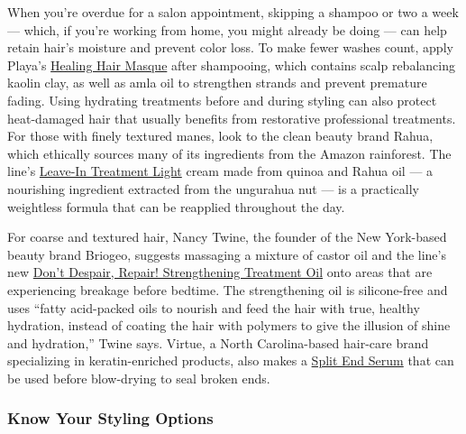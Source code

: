 When you're overdue for a salon appointment, skipping a shampoo or two a
week --- which, if you're working from home, you might already be doing
--- can help retain hair's moisture and prevent color loss. To make
fewer washes count, apply Playa's
\href{https://playabeauty.com/products/healing-hair-masque}{Healing Hair
Masque} after shampooing, which contains scalp rebalancing kaolin clay,
as well as amla oil to strengthen strands and prevent premature fading.
Using hydrating treatments before and during styling can also protect
heat-damaged hair that usually benefits from restorative professional
treatments. For those with finely textured manes, look to the clean
beauty brand Rahua, which ethically sources many of its ingredients from
the Amazon rainforest. The line's
\href{https://rahua.com/collections/styling/products/rahua-leave-in-treatment-light}{Leave-In
Treatment Light} cream made from quinoa and Rahua oil --- a nourishing
ingredient extracted from the ungurahua nut --- is a practically
weightless formula that can be reapplied throughout the day.

For coarse and textured hair, Nancy Twine, the founder of the New
York-based beauty brand Briogeo, suggests massaging a mixture of castor
oil and the line's new
\href{https://briogeohair.com/products/dont-despair-repair-strengthening-treatment-oil?flow_enabled=false\&gclid=EAIaIQobChMI75KkzbTH6AIVDW6GCh0NJgsZEAQYASABEgLgEfD_BwE}{Don't
Despair, Repair! Strengthening Treatment Oil} onto areas that are
experiencing breakage before bedtime. The strengthening oil is
silicone-free and uses ``fatty acid-packed oils to nourish and feed the
hair with true, healthy hydration, instead of coating the hair with
polymers to give the illusion of shine and hydration,'' Twine says.
Virtue, a North Carolina-based hair-care brand specializing in
keratin-enriched products, also makes a
\href{https://www.virtuelabs.com/en/perfect-ending-split-end-serum.html}{Split
End Serum} that can be used before blow-drying to seal broken ends.

\hypertarget{know-your-styling-options}{%
\subsubsection{Know Your Styling
Options}\label{know-your-styling-options}}

